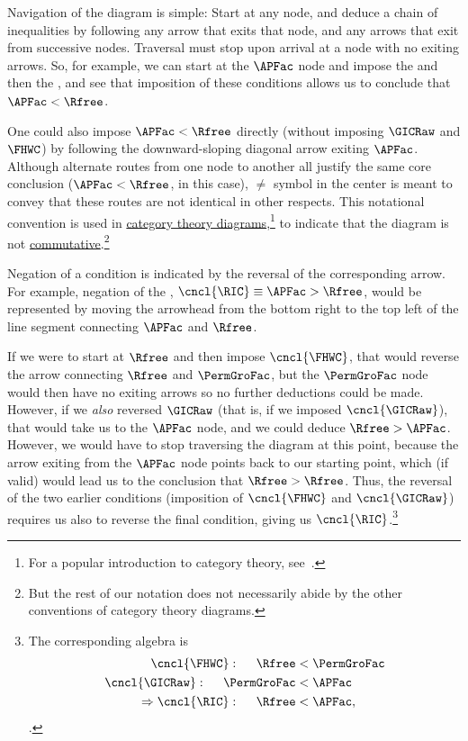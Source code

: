 \documentclass[\econtexRoot/BufferStockTheory]{subfiles}
\begin{document}
Navigation of the diagram is simple: Start at any node, and deduce a chain of inequalities by following any arrow that exits that node, and any arrows that exit from successive nodes.
Traversal must stop upon arrival at a node with no exiting arrows.
So, for example, we can start at the $\APFac$ node and impose the {\GICRaw} and then the {\FHWC}, and see that imposition of these conditions allows us to conclude that $\APFac < \Rfree$.

One could also impose $\APFac < \Rfree$ directly (without imposing $\GICRaw$ and $\FHWC$) by following the downward-sloping diagonal arrow exiting $\APFac$.
Although alternate routes from one node to another all justify the same core conclusion ($\APFac < \Rfree$, in this case), $\neq$ symbol in the center is meant to convey that these routes are not identical in other respects.
This notational convention is used in \href{https://en.wikipedia.org/wiki/Diagram_(category_theory)}{category theory diagrams},\footnote{For a popular introduction to category theory, see~\cite{riehl2017category}.} to indicate that the diagram is not \href{https://en.wikipedia.org/wiki/Commutative_diagram}{commutative}.\footnote{But the rest of our notation does not necessarily abide by the other conventions of category theory diagrams.}

Negation of a condition is indicated by the reversal of the corresponding arrow.
For example, negation of the {\RIC},  $\cncl{\RIC} \equiv \APFac > \Rfree$, would be represented by moving the arrowhead from the bottom right to the top left of the line segment connecting {$\APFac$} and $\Rfree$.

If we were to start at $\Rfree$ and then impose $\cncl{\FHWC}$, that would reverse the arrow connecting $\Rfree$ and $\PermGroFac$, but the $\PermGroFac$ node would then have no exiting arrows so no further deductions could be made.
However, if we \textit{also} reversed $\GICRaw$ (that is, if we imposed $\cncl{\GICRaw}$), that would take us to the $\APFac$ node, and we could deduce $\Rfree > \APFac$.
However, we would have to stop traversing the diagram at this point, because the arrow exiting from the $\APFac$ node points back to our starting point, which (if valid) would lead us to the conclusion that $\Rfree > \Rfree$.
Thus, the reversal of the two earlier conditions (imposition of $\cncl{\FHWC}$ and $\cncl{\GICRaw}$) requires us also to reverse the final condition, giving us $\cncl{\RIC}$.\footnote{The corresponding algebra is
\begin{equation}\begin{gathered}\begin{aligned}
  \cncl{\FHWC}:~~~~  \Rfree & < \PermGroFac \notag  
  \\ \cncl{\GICRaw}:~~~~ \PermGroFac & < \APFac %
                                \label{eq:cnclRIC}
  \\ \Rightarrow \cncl{\RIC}:~~~~\Rfree & < \APFac \notag,
\end{aligned}\end{gathered}\end{equation}.}
\end{document}
